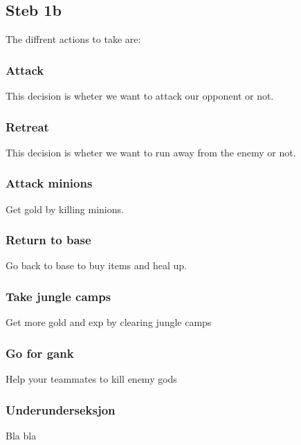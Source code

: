 \documentclass[titlepage]{article}
\begin{document}
\subsection{Steb 1b}
The diffrent actions to take are:
\subsubsection*{Attack}
This decision is wheter we want to attack our opponent or not.
\subsubsection*{Retreat}
This decision is wheter we want to run away from the enemy or not.
\subsubsection*{Attack minions}
Get gold by killing minions.
\subsubsection*{Return to base}
Go back to base to buy items and heal up.
\subsubsection*{Take jungle camps}
Get more gold and exp by clearing jungle camps
\subsubsection*{Go for gank}
Help your teammates to kill enemy gods

\subsubsection{Underunderseksjon}
Bla bla
\end{document}
